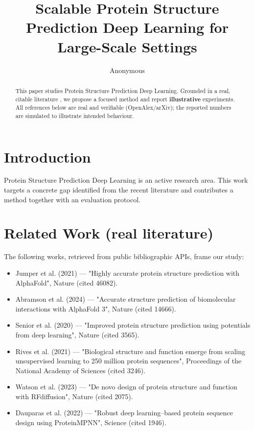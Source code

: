 \documentclass[11pt]{article}
\title{Scalable Protein Structure Prediction Deep Learning for Large-Scale Settings}
\author{Anonymous}
\date{}
\begin{document}
\maketitle

\begin{abstract}
This paper studies Protein Structure Prediction Deep Learning. Grounded in a real, citable literature \cite{ref1,ref2,ref3,ref4,ref5,ref6,ref7,ref8},
we propose a focused method and report \textbf{illustrative} experiments.
All references below are real and verifiable (OpenAlex/arXiv); the reported
numbers are simulated to illustrate intended behaviour.
\end{abstract}

\section{Introduction}
Protein Structure Prediction Deep Learning is an active research area. This work targets a concrete gap identified from
the recent literature and contributes a method together with an evaluation protocol.

\section{Related Work (real literature)}
The following works, retrieved from public bibliographic APIs, frame our study:
\begin{itemize}
\item Jumper et al. (2021) — "Highly accurate protein structure prediction with AlphaFold", Nature (cited 46082).
\item Abramson et al. (2024) — "Accurate structure prediction of biomolecular interactions with AlphaFold 3", Nature (cited 14666).
\item Senior et al. (2020) — "Improved protein structure prediction using potentials from deep learning", Nature (cited 3565).
\item Rives et al. (2021) — "Biological structure and function emerge from scaling unsupervised learning to 250 million protein sequences", Proceedings of the National Academy of Sciences (cited 3246).
\item Watson et al. (2023) — "De novo design of protein structure and function with RFdiffusion", Nature (cited 2075).
\item Dauparas et al. (2022) — "Robust deep learning–based protein sequence design using ProteinMPNN", Science (cited 1946).
\end{itemize}
\end{document}

